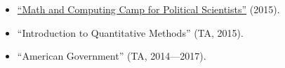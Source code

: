 \begin{enumerate}
    \begin{itemize}
      \item[\textcolor{gray}{\textbullet}] \href{http://github.com/hbahamonde/Math-Camp/raw/master/Syllabus/Math_Camp_Syllabus.pdf/}{``Math and Computing Camp for Political Scientists''} (2015).
      
      \item[\textcolor{gray}{\textbullet}] ``Introduction to Quantitative Methods'' (TA, 2015).
      
      \item[\textcolor{gray}{\textbullet}] ``American Government'' (TA, 2014---2017).
    \end{itemize}

\end{enumerate}